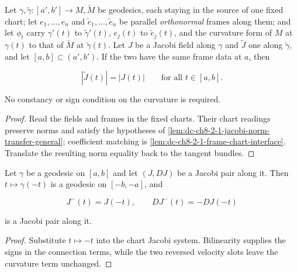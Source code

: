 \begin{lemma}
  \label{lem:dc-ch8-2-1-jacobi-norm-transfer-manifold}
  \leanok
  Let $\gamma,\tilde\gamma:[a',b']\to M,\tilde M$ be geodesics, each staying in the source of
  one fixed chart; let $e_1,\dots,e_n$ and $\tilde e_1,\dots,\tilde e_n$ be parallel
  \emph{orthonormal} frames along them; and let $\phi_t$ carry $\gamma'(t)$ to
  $\tilde\gamma'(t)$, $e_j(t)$ to $\tilde e_j(t)$, and the curvature form of $M$ at
  $\gamma(t)$ to that of $\tilde M$ at $\tilde\gamma(t)$. Let $J$ be
  a Jacobi field along $\gamma$ and $\tilde J$ one along $\tilde\gamma$, and let
  $[a,b]\subset(a',b')$. If the two have the same frame data at $a$, then

  $$
  |\tilde J(t)|=|J(t)|\qquad\text{for all }t\in[a,b] .
  $$

  No constancy or sign condition on the curvature is required.
\end{lemma}
\begin{proof}
  \leanok
\sketch
  Read the fields and frames in the fixed charts. Their chart readings preserve norms and
  satisfy the hypotheses of \cref{lem:dc-ch8-2-1-jacobi-norm-transfer-general}; coefficient
  matching is \cref{lem:dc-ch8-2-1-frame-chart-interface}. Translate the resulting norm
  equality back to the tangent bundles.
\end{proof}

\begin{lemma}
  \label{lem:dc-ch8-2-1-jacobi-reversal}
  \leanok
  Let $\gamma$ be a geodesic on $[a,b]$ and let $(J,DJ)$ be a Jacobi pair along it. Then
  $t\mapsto\gamma(-t)$ is a geodesic on $[-b,-a]$, and

  $$
  J^-(t)=J(-t),\qquad DJ^-(t)=-DJ(-t)
  $$

  is a Jacobi pair along it.
\end{lemma}
\begin{proof}
  \leanok
\sketch
  Substitute $t\mapsto-t$ into the chart Jacobi system. Bilinearity supplies the signs in
  the connection terms, while the two reversed velocity slots leave the curvature term
  unchanged.
\end{proof}

